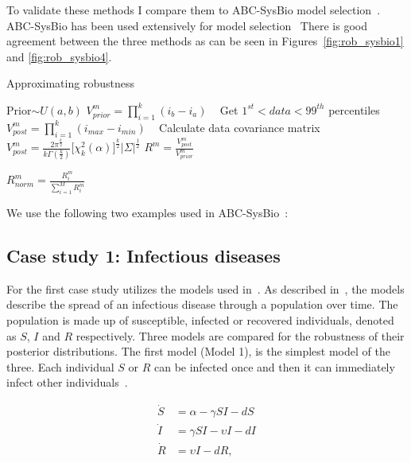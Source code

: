 To validate these methods I compare them to  ABC-SysBio model selection~\autocite{Liepe:2014iw}. ABC-SysBio has been used extensively for model selection~\autocite{Toni:2009tr, Toni:2011jy, Barnes:2011hh} There is good agreement between the three methods as can be seen in Figures~\ref{fig:rob_sysbio1} and \ref{fig:rob_sysbio4}.


\begin{algorithm}[htbp]
\caption{Approximating robustness}
\label{alg:robustness}

 \begin{algorithmic}[1]
    \Statex
		\State Prior$\sim U(a, b)$
    	\State $V_{prior}^{m} = \prod_{i=1}^{k} (i_{b} - i_{a})$ \
		\Statex
			\State Get $1^{st} < data < 99^{th}$ percentiles
    		\State $V_{post}^{m} = \prod_{i=1}^{k} (i_{max} - i_{min})$ \
    		\EndIf
			\If{Ellipsoid calculation}
				\State Calculate data covariance matrix
    			\State $V_{post}^{m} = \frac{2\pi^{\frac{k}{2}}}{k\Gamma(\frac{k}{2})} \Big[ \chi _{k}^{2}(\alpha) \Big]^{\frac{k}{2}} |\Sigma|^\frac{1}{2}$
    		\EndIf
			\Statex
			\State $R^{m} = \frac{V_{post}^{m}}{V_{prior}^{m}}$
			
			\State $R_{norm}^{m} = \frac{R^{m}_i}{\sum_{i=1}^{M} R^m_i }$
		\EndFor
  \end{algorithmic}
\end{algorithm}	
\clearpage
We use the following two examples used in ABC-SysBio~\autocite{Toni:2009tr}:

\subsection{Case study 1: Infectious diseases}
\label{sec:cs1}

For the first case study utilizes the models used in~\textcite{Toni:2009tr}. As described in~\textcite{Toni:2009tr}, the models describe the spread of an infectious disease through a population over time. The population is made up of susceptible, infected or recovered individuals, denoted as $S$, $I$ and $R$ respectively. Three models are compared for the robustness of their posterior distributions. The first model (Model 1), is the simplest model of the three. Each individual $S$ or $R$ can be infected once and then it can immediately infect other individuals~\autocite{Toni:2009tr}.

\begin{align}
\dot S &= \alpha - \gamma SI - dS \\
\dot I &= \gamma SI - \upsilon I - dI \\
\dot R &= \upsilon I - dR,
\end{align}

